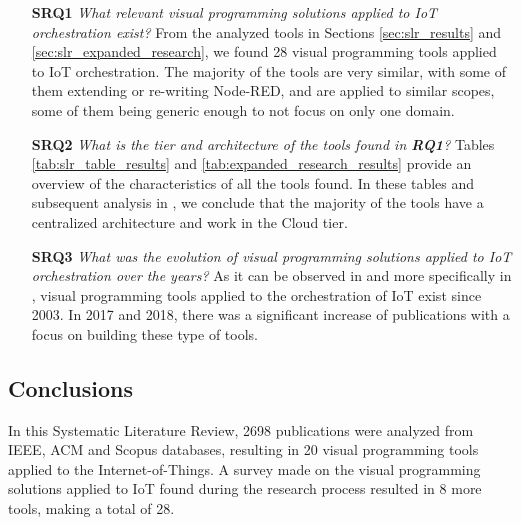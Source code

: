 \begin{itemize}

\item[\textbf{SRQ1}] \textit{What relevant visual programming solutions applied to IoT orchestration exist?} From the analyzed tools in Sections \ref{sec:slr_results} and \ref{sec:slr_expanded_research}, we found 28 visual programming tools applied to IoT orchestration. The majority of the tools are very similar, with some of them extending or re-writing Node-RED, and are applied to similar scopes, some of them being generic enough to not focus on only one domain.

\item[\textbf{SRQ2}] \textit{What is the tier and architecture of the tools found in \textbf{RQ1}?} Tables \ref{tab:slr_table_results} and \ref{tab:expanded_research_results} provide an overview of the characteristics of all the tools found. In these tables and subsequent analysis in , we conclude that the majority of the tools have a centralized architecture and work in the Cloud tier.

\item[\textbf{SRQ3}] \textit{What was the evolution of visual programming solutions applied to IoT orchestration over the years?} As it can be observed in  and more specifically in , visual programming tools applied to the orchestration of IoT exist since 2003. In 2017 and 2018, there was a significant increase of publications with a focus on building these type of tools.  
\end{itemize}


\subsection{Conclusions}\label{sec:slr_conclusions}

In this Systematic Literature Review, 2698 publications were analyzed from IEEE, ACM and Scopus databases, resulting in 20 visual programming tools applied to the Internet-of-Things. A survey made on the visual programming solutions applied to IoT found during the research process resulted in 8 more tools, making a total of 28.


